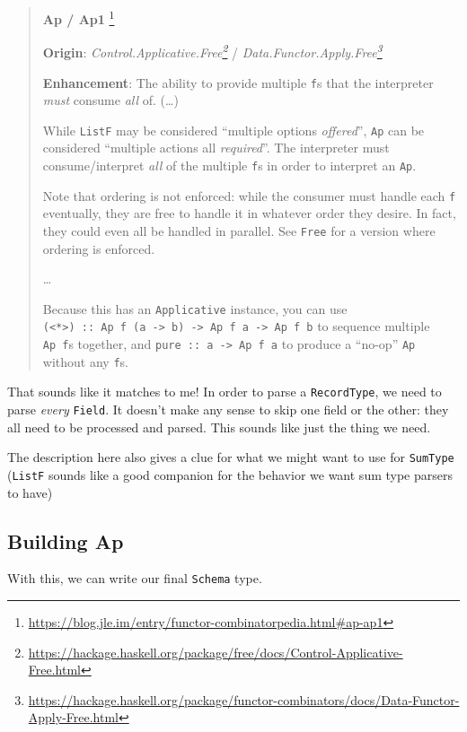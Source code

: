 \documentclass[]{article}
\renewcommand{\href}[2]{#2\footnote{\url{#1}}}
\begin{document}
\begin{quote}
\href{https://blog.jle.im/entry/functor-combinatorpedia.html\#ap-ap1}{\textbf{Ap
/ Ap1 }}

\textbf{Origin}:
\emph{\href{https://hackage.haskell.org/package/free/docs/Control-Applicative-Free.html}{Control.Applicative.Free}}
/
\emph{\href{https://hackage.haskell.org/package/functor-combinators/docs/Data-Functor-Apply-Free.html}{Data.Functor.Apply.Free}}

\textbf{Enhancement}: The ability to provide multiple \texttt{f}s that the
interpreter \emph{must} consume \emph{all} of. (\ldots)

While \texttt{ListF} may be considered ``multiple options \emph{offered}'',
\texttt{Ap} can be considered ``multiple actions all \emph{required}''. The
interpreter must consume/interpret \emph{all} of the multiple \texttt{f}s in
order to interpret an \texttt{Ap}.

Note that ordering is not enforced: while the consumer must handle each
\texttt{f} eventually, they are free to handle it in whatever order they desire.
In fact, they could even all be handled in parallel. See \texttt{Free} for a
version where ordering is enforced.

\ldots{}

Because this has an \texttt{Applicative} instance, you can use
\texttt{(\textless{}*\textgreater{})\ ::\ Ap\ f\ (a\ -\textgreater{}\ b)\ -\textgreater{}\ Ap\ f\ a\ -\textgreater{}\ Ap\ f\ b}
to sequence multiple \texttt{Ap\ f}s together, and
\texttt{pure\ ::\ a\ -\textgreater{}\ Ap\ f\ a} to produce a ``no-op''
\texttt{Ap} without any \texttt{f}s.
\end{quote}

That sounds like it matches to me! In order to parse a \texttt{RecordType}, we
need to parse \emph{every} \texttt{Field}. It doesn't make any sense to skip one
field or the other: they all need to be processed and parsed. This sounds like
just the thing we need.

The description here also gives a clue for what we might want to use for
\texttt{SumType} (\texttt{ListF} sounds like a good companion for the behavior
we want sum type parsers to have)

\subsection{Building Ap}\label{building-ap}

With this, we can write our final \texttt{Schema} type.
\end{document}
